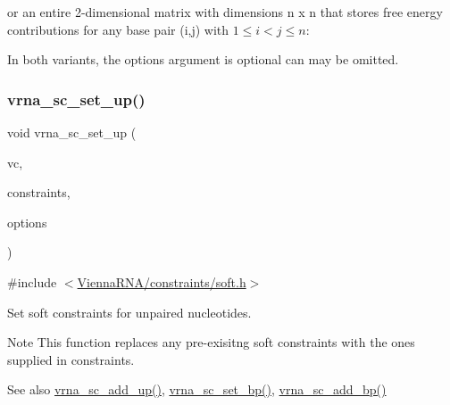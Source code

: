 \begin{DoxyCode}{0}
\end{DoxyCode}
 or an entire 2-\/dimensional matrix with dimensions n x n that stores free energy contributions for any base pair (i,j) with $ 1 \leq i < j \leq n $\+: 
\begin{DoxyCode}{0}
\end{DoxyCode}
 In both variants, the {\ttfamily options} argument is optional can may be omitted. \mbox{\label{group__soft__constraints_ga99ed63f3ef9e7fe3997932030487a344}} 
\subsubsection{\texorpdfstring{vrna\_sc\_set\_up()}{vrna\_sc\_set\_up()}}
{\footnotesize\ttfamily void vrna\+\_\+sc\+\_\+set\+\_\+up (\begin{DoxyParamCaption}\item[{\mbox{\hyperlink{group__fold__compound_ga1b0cef17fd40466cef5968eaeeff6166}{vrna\+\_\+fold\+\_\+compound\+\_\+t}} $\ast$}]{vc,  }\item[{const \mbox{\hyperlink{group__data__structures_ga31125aeace516926bf7f251f759b6126}{F\+L\+T\+\_\+\+O\+R\+\_\+\+D\+BL}} $\ast$}]{constraints,  }\item[{unsigned int}]{options }\end{DoxyParamCaption})}



{\ttfamily \#include $<$\mbox{\hyperlink{soft_8h}{Vienna\+R\+N\+A/constraints/soft.\+h}}$>$}



Set soft constraints for unpaired nucleotides. 

\begin{DoxyNote}{Note}
This function replaces any pre-\/exisitng soft constraints with the ones supplied in {\ttfamily constraints}.
\end{DoxyNote}
\begin{DoxySeeAlso}{See also}
\mbox{\hyperlink{group__soft__constraints_ga069915fe203a2c8e522dd37847177a09}{vrna\+\_\+sc\+\_\+add\+\_\+up()}}, \mbox{\hyperlink{group__soft__constraints_ga8e4334b24bc91453fbcda490a4e331af}{vrna\+\_\+sc\+\_\+set\+\_\+bp()}}, \mbox{\hyperlink{group__soft__constraints_gaf162aedac7422f2eb16ea030f47d2f4b}{vrna\+\_\+sc\+\_\+add\+\_\+bp()}}
\end{DoxySeeAlso}

